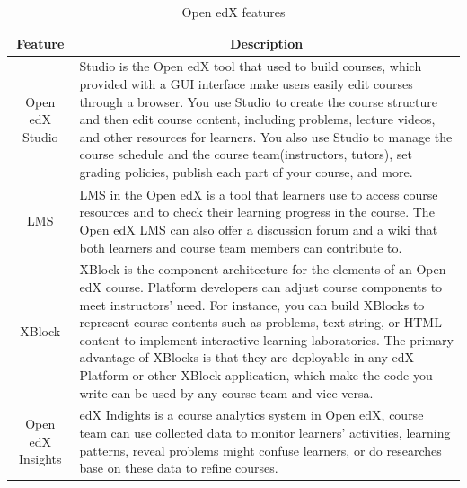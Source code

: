 \begin{table}[H]
\centering
\caption{Open edX features}
\label{table:edxfeature}
\begin{tabular}{|c|p{12cm}|}
\hline
Feature           & \multicolumn{1}{c|}{Description}                                                                                                                                                                                                                                                                                                                                                                                                                                                                                    \\ \hline
Open edX Studio   & Studio is the Open edX tool that used to build courses, which provided with a GUI interface make users easily edit courses through a browser. You use Studio to create the course structure and then edit course content, including problems, lecture videos, and other resources for learners. You also use Studio to manage the course schedule and the course team(instructors, tutors), set grading policies, publish each part of your course, and more.                                                       \\ \hline
LMS               & LMS in the Open edX is a tool that learners use to access course resources and to check their learning progress in the course. The Open edX LMS can also offer a discussion forum and a wiki that both learners and course team members can contribute to.                                                                                                                                                                                                                                                          \\ \hline
XBlock            & XBlock is the component architecture for the elements of an Open edX course. Platform developers can adjust course components to meet instructors' need. For instance, you can build XBlocks to represent course contents such as problems, text string, or HTML content to implement interactive learning laboratories. The primary advantage of XBlocks is that they are deployable in any edX Platform or other XBlock application, which make the code you write can be used by any course team and vice versa. \\ \hline
Open edX Insights & edX Indights is a course analytics system in Open edX, course team can use collected data to monitor learners' activities, learning patterns, reveal problems might confuse learners, or do researches base on these data to refine courses.                                                                                                                                                                                                                                                                        \\ \hline
\end{tabular}
\end{table}

